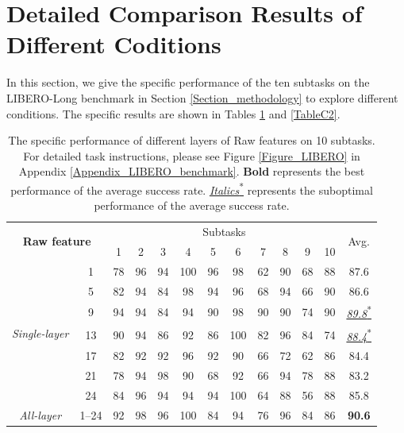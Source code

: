\vspace{3ex}

\section{Detailed Comparison Results of Different Coditions}\label{AppendixC}
\renewcommand{\thefigure}{C\arabic{figure}}
\renewcommand{\theHfigure}{C\arabic{figure}}
\setcounter{figure}{0}

\renewcommand{\thetable}{C\arabic{table}}
\renewcommand{\theHtable}{C\arabic{table}}
\setcounter{table}{0}

In this section, we give the specific performance of the ten subtasks on the LIBERO-Long benchmark in Section \ref{Section_methodology} to explore different conditions. The specific results are shown in Tables \ref{TableC1} and \ref{TableC2}.

\begin{table}[!htbp]
	\centering
    \small
	\caption{The specific performance of different layers of Raw features on 10 subtasks. For detailed task instructions, please see Figure \ref{Figure_LIBERO} in Appendix \ref{Appendix_LIBERO_benchmark}. \textbf{Bold} represents the best performance of the average success rate. \underline{\textit{Italics}\textsuperscript{*}} represents the suboptimal performance of the average success rate.}\label{TableC1}%
	\begin{tabular}{cc|cccccccccc|c}
		\toprule[1pt]
		\multicolumn{2}{c|}{\multirow{2}{*}{\textbf{Raw feature}}}&\multicolumn{10}{c|}{Subtasks}&\multirow{2}{*}{Avg.}\\
		&&1     & 2     & 3     & 4     & 5     & 6     & 7     & 8     & 9     & 10&\\
		\midrule[0.5pt]
		\multirow{7}{*}{\textit{Single-layer}}&1& 78    & 96    & 94    & 100   & 96    & 98    & 62    & 90    & 68    & 88    & 87.6 \\
		&5&    82    & 94    & 84    & 98    & 94    & 96    & 68    & 94    & 66    & 90    & 86.6 \\
		&9&    94    & 94    & 84    & 94    & 90    & 98    & 90    & 90    & 74    & 90    & \underline{\textit{89.8}\textsuperscript{*}} \\
		&13&    90    & 94    & 86    & 92    & 86    & 100   & 82    & 96    & 84    & 74    & \underline{\textit{88.4}\textsuperscript{*}} \\
		&17&    82    & 92    & 92    & 96    & 92    & 90    & 66    & 72    & 62    & 86    & 84.4 \\
		&21&    78    & 94    & 98    & 90    & 68    & 92    & 66    & 94    & 78    & 88    & 83.2 \\
		&24&    84    & 96    & 94    & 94    & 94    & 100   & 64    & 88    & 56    & 88    & 85.8 \\
		\midrule[0.5pt]
		\textit{All-layer}& 1--24&    92    & 98    & 96    & 100   & 84    & 94    & 76    & 96    & 84    & 86    & \textbf{90.6} \\
		\bottomrule[1pt]
	\end{tabular}
\end{table}%

